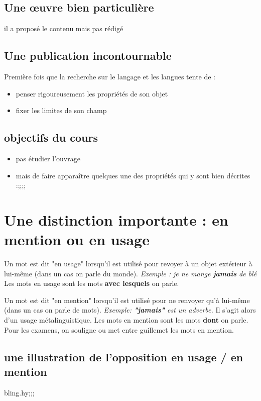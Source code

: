 \subsection{Une œuvre bien particulière}
il a proposé le contenu mais pas rédigé

\subsection{Une publication incontournable}
Première fois que la recherche sur le langage et les langues tente de :
\begin{itemize}
   \item penser rigoureusement les propriétés de son objet
   \item fixer les limites de son champ
\end{itemize}

\subsection{objectifs du cours}
\begin{itemize}
   \item pas étudier l'ouvrage
   \item mais de faire apparaître quelques une des propriétés qui y sont bien décrites :;;;;
\end{itemize}

\section{Une distinction importante : en mention ou en usage}

Un mot est dit "en usage" lorsqu'il est utilisé pour revoyer à un objet extérieur à lui-même (dans un cas on parle du monde).
\textit{Exemple : je ne mange \textbf{jamais} de blé}
Les mots en usage sont les mots \textbf{avec lesquels} on parle.

Un mot est dit "en mention" lorsqu'il est utilisé pour ne renvoyer qu'à lui-même (dans un cas on parle de mots).
\textit{Exemple: \textbf{"jamais"} est un adverbe.}
Il s'agit alors d'un usage métalinguistique.
Les mots en mention sont les mots \textbf{dont} on parle.
Pour les examens, on souligne ou met entre guillemet les mots en mention.

\subsection{une illustration de l'opposition en usage / en mention}
bling.hy;;;

